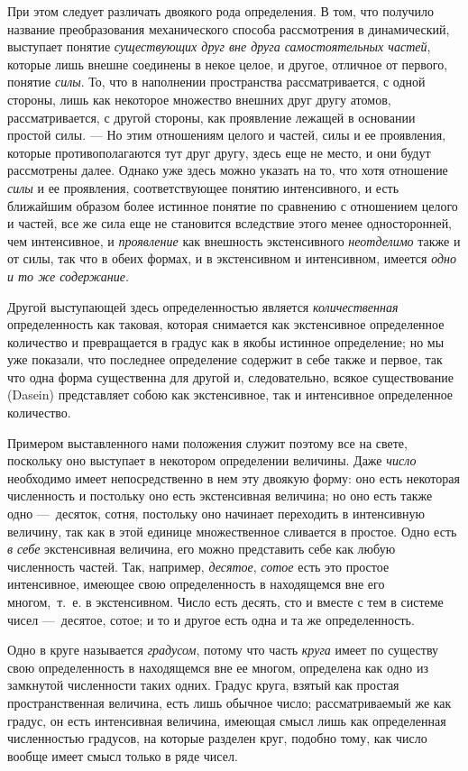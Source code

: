 {При этом следует различать двоякого рода определения. В том, что получило
название преобразования механического способа рассмотрения в динамический,
выступает понятие {\em существующих друг вне друга
самостоятельных частей}, которые лишь внешне соединены в некое целое, и
другое, отличное от первого, понятие {\em силы}. То,
что в наполнении пространства рассматривается, с одной стороны, лишь как
некоторое множество внешних друг другу атомов, рассматривается, с другой
стороны, как проявление лежащей в основании простой силы. — Но этим
отношениям целого и частей, силы и ее проявления, которые противополагаются
тут друг другу, здесь еще не место, и они будут рассмотрены далее. Однако
уже здесь можно указать на то, что хотя отношение
{\em силы} и ее проявления, соответствующее понятию
интенсивного, и есть ближайшим образом более истинное понятие по сравнению
с отношением целого и частей, все же сила еще не становится вследствие
этого менее односторонней, чем интенсивное, и
{\em проявление} как внешность экстенсивного
{\em неотделимо} также и от силы, так что в обеих
формах, и в экстенсивном и интенсивном, имеется
{\em одно и то же содержание}.

Другой выступающей здесь определенностью является
{\em количественная} определенность как таковая,
которая снимается как экстенсивное определенное количество и превращается в
градус как в якобы истинное определение; но мы уже показали, что последнее
определение содержит в себе также и первое, так что одна форма существенна
для другой и, следовательно, всякое существование (Dasein) представляет
собою как экстенсивное, так и интенсивное определенное количество.

Примером выставленного нами положения служит поэтому все на свете, поскольку
оно выступает в некотором определении величины. Даже
{\em число} необходимо имеет непосредственно в нем эту
двоякую форму: оно есть некоторая численность и постольку оно есть
экстенсивная величина; но оно есть также одно —~десяток, сотня, постольку
оно начинает переходить в интенсивную величину, так как в этой единице
множественное сливается в простое. Одно есть {\em в
себе} экстенсивная величина, его можно представить себе как любую
численность частей. Так, например, {\em десятое},
{\em сотое} есть это простое интенсивное, имеющее свою
определенность в находящемся вне его многом,~т.~е. в экстенсивном. Число
есть десять, сто и вместе с тем в системе чисел —~десятое, сотое; и то и
другое есть одна и та же определенность.

Одно в круге называется {\em градусом}, потому что часть
{\em круга} имеет по существу свою определенность в
находящемся вне ее многом, определена как одно из замкнутой численности
таких одних. Градус круга, взятый как простая пространственная величина,
есть лишь обычное число; рассматриваемый же как градус, он есть интенсивная
величина, имеющая смысл лишь как определенная численностью градусов, на
которые разделен круг, подобно тому, как число вообще имеет смысл только в
ряде чисел.

}
